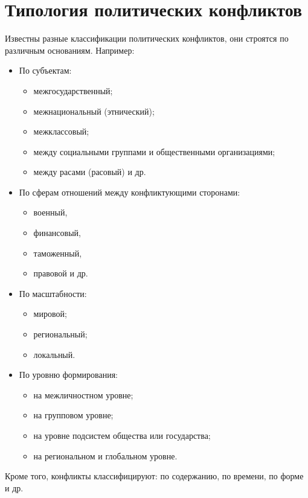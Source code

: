 \documentclass[a4paper,12pt,notitlepage,pdftex,headsepline]{scrartcl}
\begin{document}
\section{Типология политических конфликтов}
  Известны разные классификации политических конфликтов, они строятся по
  различным основаниям.
  Например:
  \begin{itemize}
    \item По субъектам:
      \begin{itemize}
        \item межгосударственный;
        \item межнациональный (этнический);
        \item межклассовый;
        \item между социальными группами и общественными организациями;
        \item между расами (расовый) и др.
      \end{itemize}
    \item По сферам отношений между конфликтующими сторонами:
      \begin{itemize}
        \item военный,
        \item финансовый,
        \item таможенный,
        \item правовой и др.
      \end{itemize}
    \item По масштабности:
      \begin{itemize}
        \item мировой;
        \item региональный;
        \item локальный.
      \end{itemize}
    \item По уровню формирования:
      \begin{itemize}
        \item на межличностном уровне;
        \item на групповом уровне;
        \item на уровне подсистем общества или государства;
        \item на региональном и глобальном уровне.
      \end{itemize}
  \end{itemize}

  Кроме того, конфликты классифицируют: по содержанию, по времени, по форме и
  др.
\end{document}
